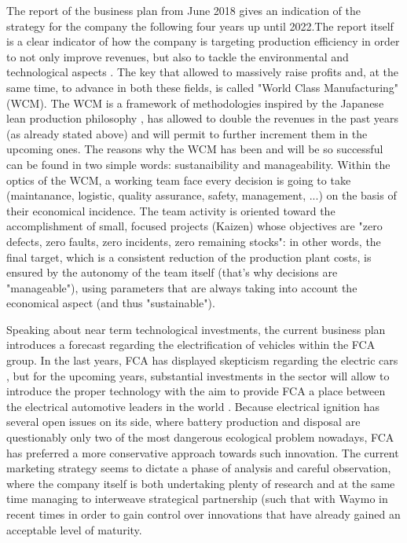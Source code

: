 The report of the business plan from June 2018 gives an indication of the strategy for the company the following four years up until 2022.The report itself is a clear indicator of how the company is targeting production efficiency in order to not only improve revenues, but also to tackle the environmental and technological aspects \cite{fca_financial_overview}. The key that allowed to massively raise profits and, at the same time, to advance in both these fields, is called "World Class Manufacturing" (WCM). The WCM is a framework of methodologies inspired by the Japanese lean production philosophy \cite{fca_wcm}, has allowed  to double the revenues in the past years (as already stated above) and will permit to further increment them in the upcoming ones. 
The reasons why the WCM has been and will be so successful can be found in two simple words: sustanaibility and manageability. Within the optics of the WCM, a working team face every decision is going to take (maintanance, logistic, quality assurance, safety, management, ...) on the basis of their economical incidence. The team activity is oriented toward the accomplishment of small, focused projects (Kaizen) whose objectives are "zero defects, zero faults, zero incidents, zero remaining stocks": in other words, the final target, which is a consistent reduction of the production plant costs, is ensured by the autonomy of the team itself (that's why decisions are "manageable"), using parameters that are always taking into account the economical aspect (and thus "sustainable").

Speaking about near term technological investments, the current business plan introduces a forecast regarding the electrification of vehicles within the FCA group. In the last years, FCA has displayed skepticism regarding the electric cars \cite{fca_electric_bet}, but for the upcoming years, substantial investments in the sector will allow to introduce the proper technology with the aim to provide FCA a place between the electrical automotive leaders in the world \cite{fca_financial_overview}. Because electrical ignition has several open issues on its side, where battery production and disposal are questionably only two of the most dangerous ecological problem nowadays, FCA has preferred a more conservative approach towards such innovation. The current marketing strategy \cite{fca_financial_overview} seems to dictate a phase of analysis and careful observation, where the company itself is both undertaking plenty of research and at the same time managing to interweave strategical partnership (such that with Waymo in recent times \cite{fca_waymo_partnership} in order to gain control over innovations that have already gained an acceptable level of maturity.



